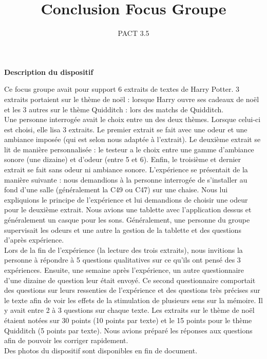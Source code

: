 \documentclass[a4paper,14pt]{report}
\title{Conclusion Focus Groupe}
\author{PACT 3.5}
\begin{document}
\maketitle




\begin{center}
\textbf{Description du dispositif}
\end{center}

Ce focus groupe avait pour support 6 extraits de textes de Harry Potter. 3 extraits portaient sur le thème 
de noël : lorsque Harry ouvre ses cadeaux de noël et les 3 autres sur le thème Quidditch : lors des matchs de 
Quidditch. \\
Une personne interrogée avait le choix entre un des deux thèmes. Lorsque celui-ci est choisi, elle lisa 3 extraits. Le premier extrait se fait avec une odeur et une ambiance imposée (qui est selon nous adaptée à l'extrait). Le deuxième extrait se lit de manière personnalisée : le testeur a le choix entre une gamme d'ambiance sonore (une dizaine) et d'odeur (entre 5 et 6). Enfin, le troisième et dernier extrait se fait sans odeur ni ambiance sonore.
L'expérience se présentait de la manière suivante : nous demandions à la personne interrogée de s'installer au fond d'une salle (généralement la C49 ou C47) sur une chaise. Nous lui expliquions le principe de l'expérience et lui demandions de choisir une odeur pour le deuxième extrait. Nous avions une tablette avec l'application dessus et généralement un casque pour les sons. Généralement, une personne du groupe supervisait les odeurs et une autre la gestion de la tablette et des questions d'après expérience. \\
Lors de la fin de l'expérience (la lecture des trois extraits), nous invitions la personne à répondre à 5 questions qualitatives sur ce qu'ils ont pensé des 3 expériences. Ensuite, une semaine après l'expérience, un autre questionnaire d'une dizaine de question leur était envoyé. Ce second questionnaire comportait des questions sur leurs ressenties de l'expérience et des questions très précises sur le texte afin de voir les effets de la stimulation de plusieurs sens sur la mémoire. Il y avait entre 2 à 3 questions sur chaque texte. Les extraits sur le thème de noël étaient notées sur 30 points (10 points par texte) et le 15 points pour le thème Quidditch (5 points par texte). Nous avions préparé les réponses aux questions afin de pouvoir les corriger rapidement.\\
Des photos du dispositif sont disponibles en fin de document. 
\end{document}
